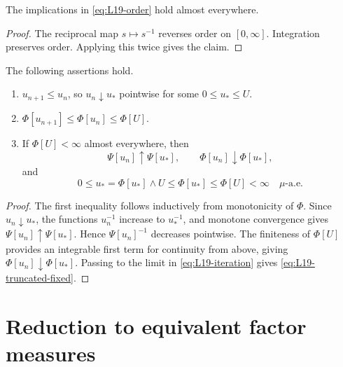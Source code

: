 \begin{lemma}\label{lem:L19-monotonicity}
The implications in \eqref{eq:L19-order} hold almost everywhere.
\end{lemma}
\begin{proof}
The reciprocal map $s\mapsto s^{-1}$ reverses order on $[0,\infty]$.  Integration preserves order.  Applying this twice gives the claim.
\end{proof}

\begin{lemma}\label{lem:L19-iteration-limit}
The following assertions hold.
\begin{enumerate}[label=(\alph*),leftmargin=2em]
\item $u_{n+1}\le u_n$, so $u_n\downarrow u_*$ pointwise for some $0\le u_*\le U$.
\item $\Phi[u_{n+1}]\le\Phi[u_n]\le\Phi[U]$.
\item If $\Phi[U]<\infty$ almost everywhere, then
\[
 \Psi[u_n]\uparrow\Psi[u_*],
 \qquad
 \Phi[u_n]\downarrow\Phi[u_*],
\]
and
\begin{equation}\label{eq:L19-truncated-fixed}
 0\le u_*=\Phi[u_*]\wedge U\le\Phi[u_*]\le\Phi[U]<\infty
 \quad\mu\text{-a.e.}
\end{equation}
\end{enumerate}
\end{lemma}
\begin{proof}
The first inequality follows inductively from monotonicity of $\Phi$.  Since $u_n\downarrow u_*$, the functions $u_n^{-1}$ increase to $u_*^{-1}$, and monotone convergence gives $\Psi[u_n]\uparrow\Psi[u_*]$.  Hence $\Psi[u_n]^{-1}$ decreases pointwise.  The finiteness of $\Phi[U]$ provides an integrable first term for continuity from above, giving $\Phi[u_n]\downarrow\Phi[u_*]$.  Passing to the limit in \eqref{eq:L19-iteration} gives \eqref{eq:L19-truncated-fixed}.
\end{proof}

\section{Reduction to equivalent factor measures}

